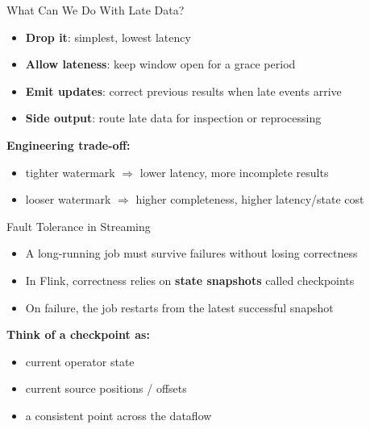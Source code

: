 \documentclass[aspectratio=169]{beamer}
\begin{document}
\begin{frame}{What Can We Do With Late Data?}
\begin{itemize}
    \item \textbf{Drop it}: simplest, lowest latency
    \item \textbf{Allow lateness}: keep window open for a grace period
    \item \textbf{Emit updates}: correct previous results when late events arrive
    \item \textbf{Side output}: route late data for inspection or reprocessing
\end{itemize}

\vspace{0.4cm}
\textbf{Engineering trade-off:}
\begin{itemize}
    \item tighter watermark $\Rightarrow$ lower latency, more incomplete results
    \item looser watermark $\Rightarrow$ higher completeness, higher latency/state cost
\end{itemize}
\end{frame}

\begin{frame}{Fault Tolerance in Streaming}
\begin{itemize}
    \item A long-running job must survive failures without losing correctness
    \item In Flink, correctness relies on \textbf{state snapshots} called checkpoints
    \item On failure, the job restarts from the latest successful snapshot
\end{itemize}

\vspace{0.3cm}
\textbf{Think of a checkpoint as:}
\begin{itemize}
    \item current operator state
    \item current source positions / offsets
    \item a consistent point across the dataflow
\end{itemize}
\end{frame}
\end{document}
